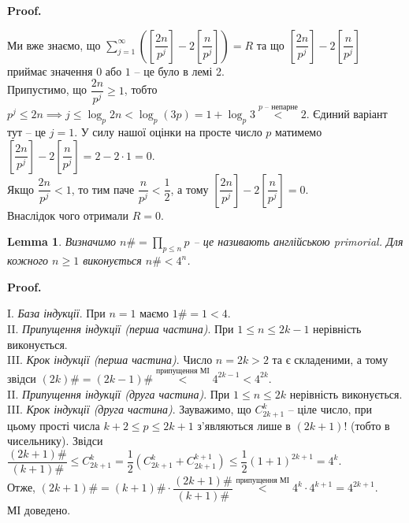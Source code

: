 \documentclass[a4paper, 10pt]{article}
\makeatletter
\theoremstyle{theoremdd}
\theoremstyle{theoremdd}
\theoremstyle{theoremdd}
\theoremstyle{theoremdd}
\theoremstyle{theoremdd}
\theoremstyle{theoremdd}
\theoremstyle{theoremdd}
\newtheorem{lemma}[theorem]{Lemma}
\theoremstyle{theoremdd}
\renewenvironment{proof}[1][Proof.\\]{\par
\pushQED{\hfill \qed}%
\normalfont \topsep6\p@\@plus6\p@\relax
\trivlist
\item\relax
{\bfseries
#1\@addpunct{.}}\hspace\labelsep\ignorespaces
}{%
\popQED\endtrivlist\@endpefalse
}
\makeatother
\begin{document}
\begin{proof}
Ми вже знаємо, що $\displaystyle\sum_{j=1}^\infty \left( \left[ \dfrac{2n}{p^j} \right] - 2 \left[ \dfrac{n}{p^j} \right] \right) = R$ та що $\left[ \dfrac{2n}{p^j} \right] - 2 \left[ \dfrac{n}{p^j} \right]$ приймає значення $0$ або $1$ -- це було в лемі 2. \\
Припустимо, що $\dfrac{2n}{p^j} \geq 1$, тобто $p^j \leq 2n \implies j \leq \log_p 2n < \log_p (3p) = 1 + \log_p 3 \overset{\text{$p$ -- непарне}}{<} 2$. Єдиний варіант тут -- це $j = 1$. У силу нашої оцінки на просте число $p$ матимемо $\left[ \dfrac{2n}{p^j} \right] - 2 \left[ \dfrac{n}{p^j} \right] = 2 - 2 \cdot 1 = 0$.\\
Якщо $\dfrac{2n}{p^j} < 1$, то тим паче $\dfrac{n}{p^j} < \dfrac{1}{2}$, а тому $\left[ \dfrac{2n}{p^j} \right] - 2 \left[ \dfrac{n}{p^j} \right] = 0$.\\
Внаслідок чого отримали $R = 0$. 
\end{proof}

\begin{lemma}
Визначимо $n \# = \displaystyle\prod_{p \leq n} p$ -- це називають англійською primorial. Для кожного $n \geq 1$ виконується $n \# < 4^n$.
\end{lemma}

\begin{proof}
I. \textit{База індукції}. При $n = 1$ маємо $1 \# = 1 < 4$.\\
II. \textit{Припущення індукції (перша частина)}. При $1 \leq n \leq 2k-1$ нерівність виконується.\\
III. \textit{Крок індукції (перша частина)}. Число $n = 2k > 2$ та є складеними, а тому звідси $(2k)\# = (2k-1)\# \overset{\text{припущення МІ}}{<} 4^{2k-1} < 4^{2k}$.
\bigskip \\
II. \textit{Припущення індукції (друга частина)}. При $1 \leq n \leq 2k$ нерівність виконується.\\
III. \textit{Крок індукції (друга частина)}. Зауважимо, що $C_{2k+1}^k$ -- ціле число, при цьому прості числа $k+2 \leq p \leq 2k+1$ з'являються лише в $(2k+1)!$ (тобто в чисельнику). Звідси\\
$\dfrac{(2k+1)\#}{(k+1)\#} \leq C_{2k+1}^k = \dfrac{1}{2} (C_{2k+1}^k + C_{2k+1}^{k+1}) \leq \dfrac{1}{2} (1+1)^{2k+1} = 4^k$.\\
Отже, $(2k+1)\# = (k+1)\# \cdot \dfrac{(2k+1)\#}{(k+1)\#} \overset{\text{припущення МІ}}{<} 4^k \cdot 4^{k+1} = 4^{2k+1}$.\\
МІ доведено.
\end{proof}
\end{document}
